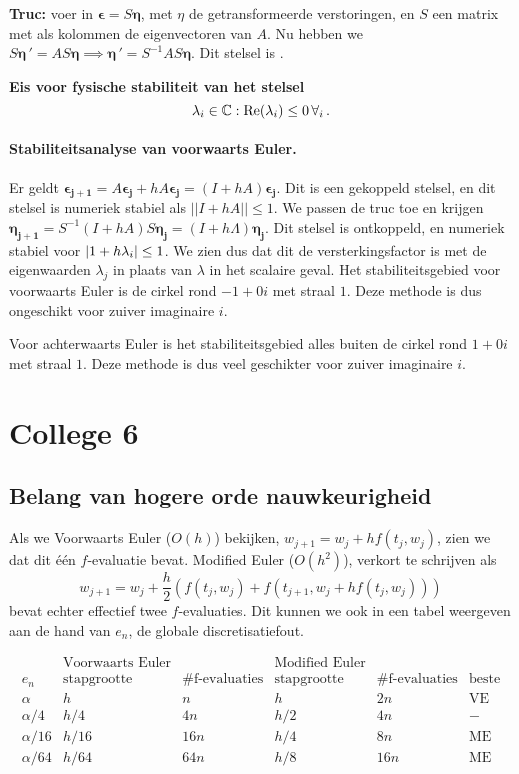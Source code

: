 \documentclass{2wn20summary}
\begin{document}
				\textbf{Truc:} voer in $ \bm{\epsilon} = S\bm{\eta} $, met $\eta$ de getransformeerde verstoringen, en $S$ een matrix met als kolommen de eigenvectoren van $A$. Nu hebben we $ S\bm{\eta} \,' = AS\bm{\eta} \implies \bm{\eta}\,' = S^{-1}AS\bm{\eta}$. Dit stelsel is .
				
				\textbf{Eis voor fysische stabiliteit van het stelsel}
				\[ 
					\lambda_i \in \mathbb{C} : \text{Re}(\lambda_i) \le 0\, \forall_i\,.
				\]
				
				\paragraph{Stabiliteitsanalyse van voorwaarts Euler.} Er geldt $ \bm{\epsilon_{j+1}} = A \bm{\epsilon_j} + hA\bm{\epsilon_j} = (I + hA)\bm{\epsilon_j} $. Dit is een gekoppeld stelsel, en dit stelsel is numeriek stabiel als $ ||I+hA||\le 1 $. We passen de truc toe en krijgen $ \bm{\eta_{j+1}} = S^{-1} (I+hA)S\bm{\eta_j} = (I+h\Lambda)\bm{\eta_j} $. Dit stelsel is ontkoppeld, en numeriek stabiel voor $ {\left|1+h\lambda_i\right|} \le 1 $. We zien dus dat dit de versterkingsfactor is met de eigenwaarden $\lambda_j$ in plaats van $\lambda$ in het scalaire geval. Het stabiliteitsgebied voor voorwaarts Euler is de cirkel rond $ -1+0i $ met straal $1$. Deze methode is dus ongeschikt voor zuiver imaginaire $i$.
				
				Voor achterwaarts Euler is het stabiliteitsgebied alles buiten de cirkel rond $ 1+0i $ met straal $1$. Deze methode is dus veel geschikter voor zuiver imaginaire $i$.
				
	\newpage
	\section{College 6}
	
	\subsection{Belang van hogere orde nauwkeurigheid}
	
		Als we Voorwaarts Euler ($O(h)$) bekijken, $w_{j+1} = w_j + hf(t_j,w_j)$, zien we dat dit \'e\'en $f$-evaluatie bevat. Modified Euler ($O(h^2)$), verkort te schrijven als
		\[ 
			w_{j+1} = w_j + \frac{h}{2} (f(t_j,w_j) + f(t_{j+1},w_j + hf(t_j,w_j)))
		 \]
		 bevat echter effectief twee $f$-evaluaties. Dit kunnen we ook in een tabel weergeven aan de hand van $e_n$, de globale discretisatiefout.
		 
		 \[ 
			 \begin{array}{c|cc|cc|c}
				 & \text {Voorwaarts Euler} & & \text {Modified Euler} & & \\
				 e_n & \text {stapgrootte} & \text {\#f-evaluaties} & \text {stapgrootte} & \text {\#f-evaluaties} & \text {beste} \\
				 \hline
				 \alpha & h &n &h &2n & \text {VE} \\
				 \alpha /4 & h/4 & 4n & h/2 & 4n & - \\
				 \alpha /16 & h/16 & 16n & h/4 & 8n & \text {ME} \\
				 \alpha /64 & h/64 & 64n & h/8 & 16n & \text {ME}
			 \end{array}
		  \]
		  
\end{document}
